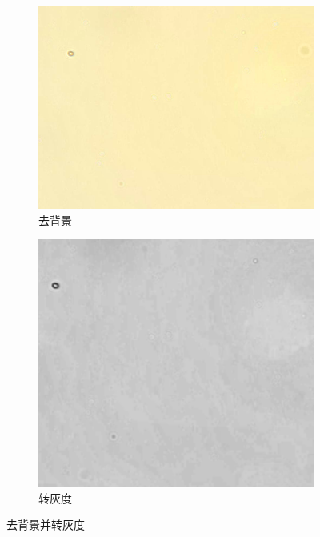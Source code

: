 \documentclass[a4paper]{report} %
\begin{document}
\begin{figure}[H]
    \centering
    \begin{subfigure}{0.45\textwidth}
        \includegraphics[width=\linewidth]{去背景.png}
        \caption{去背景}
    \end{subfigure}
    \begin{subfigure}{0.45\textwidth}
        \includegraphics[width=\linewidth]{转灰度.png}
        \caption{转灰度}
    \end{subfigure}

    \caption{去背景并转灰度}
\end{figure}
\end{document}
